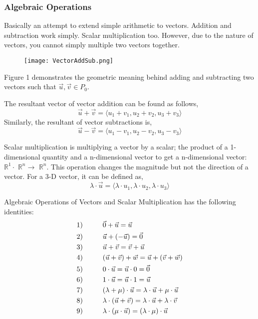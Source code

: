 \documentclass{article}
\begin{document}
\subsubsection{Algebraic Operations}
Basically an attempt to extend simple arithmetic to vectors. Addition and subtraction work simply. Scalar multiplication too. However, due to the nature of vectors, you cannot simply multiple two vectors together. 

\begin{wrapfigure}{r}{0.37\textwidth}
    \texttt{[image: VectorAddSub.png]}
    \label{fig:enter-label-1}
\end{wrapfigure}

Figure 1 demonstrates the geometric meaning behind adding and subtracting two vectors such that $\vec{u},\vec{v}\in P_0$. 

The resultant vector of vector addition can be found as follows, 
$$\vec{u}+\vec{v} = \langle u_1+v_1, u_2+v_2, u_3+v_3 \rangle$$
Similarly, the resultant of vector subtractions is,
$$\vec{u}-\vec{v} = \langle u_1-v_1, u_2-v_2, u_3-v_3 \rangle$$

Scalar multiplication is multiplying a vector by a scalar; the product of a 1-dimensional quantity and a n-dimensional vector to get a n-dimensional vector: $\mathbb{R}^1 \cdot$ $\mathbb{R}^n \longrightarrow$ $\mathbb{R}^n$. This operation changes the magnitude but not the direction of a vector. For a 3-D vector, it can be defined as,
$$\lambda \cdot \vec{u} = \langle \lambda \cdot u_1, \lambda \cdot u_2 , \lambda \cdot u_3 \rangle$$

Algebraic Operations of Vectors and Scalar Multiplication has the following identities:
\begin{align*} %
&\text{1)} \hspace{1 cm} \vec{0} + \vec{u} = \vec{u} \\
&\text{2)} \hspace{1 cm} \vec{u} + (-\vec{u}) = \vec{0} \\
&\text{3)} \hspace{1 cm} \vec{u} + \vec{v} = \vec{v} + \vec{u} \\
&\text{4)} \hspace{1 cm} (\vec{u}+\vec{v})+\vec{w}=\vec{u}+(\vec{v}+\vec{w})\\
&\text{5)} \hspace{1 cm} 0\cdot\vec{u}=\vec{u}\cdot0=\vec{0}\\
&\text{6)} \hspace{1 cm} 1\cdot\vec{u}=\vec{u}\cdot1=\vec{u} \\
&\text{7)} \hspace{1 cm} (\lambda+\mu)\cdot\vec{u}=\lambda\cdot\vec{u}+\mu\cdot\vec{u}\\
&\text{8)} \hspace{1 cm} \lambda\cdot(\vec{u}+\vec{v})=\lambda\cdot\vec{u}+\lambda\cdot\vec{v}\\
&\text{9)} \hspace{1 cm} \lambda\cdot(\mu\cdot\vec{u})=(\lambda\cdot\mu)\cdot\vec{u}
\end{align*}
\end{document}

